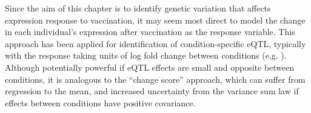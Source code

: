 Since the aim of this chapter is to identify genetic variation that affects expression response to vaccination, it may seem most direct to model the change in each individual's expression after vaccination as the response variable.
This approach has been applied for identification of condition-specific \gls{eQTL}, typically with the response taking units of log fold change between conditions (e.g. \autocite{maranville2011InteractionsGlucocorticoidTreatment,ackermann2013ImpactNaturalGenetic,shpak2014EQTLAnalysisHuman}).
Although potentially powerful if \gls{eQTL} effects are small and opposite between conditions\autocite{ackermann2013ImpactNaturalGenetic}, 
it is analogous to the \enquote{change score} approach, which can suffer from regression to the mean, and increased uncertainty from the variance sum law if effects between conditions have positive covariance\autocite{allison1990ChangeScoresDependent,clifton2019CorrelationBaselineScore}.
%

%
%
%
%
%
%


    

